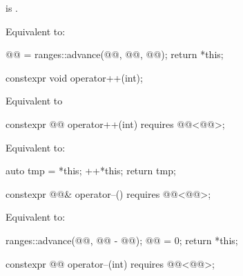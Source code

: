 \begin{itemdescr}
\pnum
\expects
{} is .

\pnum
\effects
Equivalent to:
\begin{codeblock}
@@ = ranges::advance(@@, @@, @@);
return *this;
\end{codeblock}
\end{itemdescr}

%
\begin{itemdecl}
constexpr void operator++(int);
\end{itemdecl}

\begin{itemdescr}
\pnum
\effects
Equivalent to 
\end{itemdescr}

%
\begin{itemdecl}
constexpr @@ operator++(int) requires @@<@@>;
\end{itemdecl}

\begin{itemdescr}
\pnum
\effects
Equivalent to:
\begin{codeblock}
auto tmp = *this;
++*this;
return tmp;
\end{codeblock}
\end{itemdescr}

%
\begin{itemdecl}
constexpr @@& operator--() requires @@<@@>;
\end{itemdecl}

\begin{itemdescr}
\pnum
\effects
Equivalent to:
\begin{codeblock}
ranges::advance(@@, @@ - @@);
@@ = 0;
return *this;
\end{codeblock}
\end{itemdescr}

%
\begin{itemdecl}
constexpr @@ operator--(int) requires @@<@@>;
\end{itemdecl}

